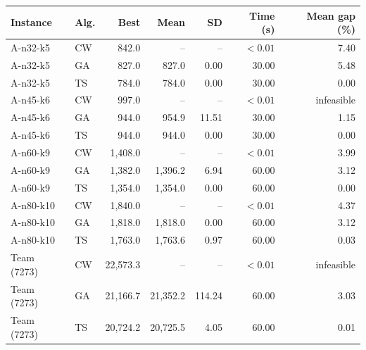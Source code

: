 \begin{tabular}{@{}llrrrrr@{}}
\toprule
Instance & Alg. & Best & Mean & SD & Time (s) & Mean gap (\%) \\
\midrule
A-n32-k5 & CW & 842.0 & -- & -- & $<0.01$ & 7.40 \\
A-n32-k5 & GA & 827.0 & 827.0 & 0.00 & 30.00 & 5.48 \\
A-n32-k5 & TS & 784.0 & 784.0 & 0.00 & 30.00 & 0.00 \\
A-n45-k6 & CW & 997.0 & -- & -- & $<0.01$ & infeasible \\
A-n45-k6 & GA & 944.0 & 954.9 & 11.51 & 30.00 & 1.15 \\
A-n45-k6 & TS & 944.0 & 944.0 & 0.00 & 30.00 & 0.00 \\
A-n60-k9 & CW & 1,408.0 & -- & -- & $<0.01$ & 3.99 \\
A-n60-k9 & GA & 1,382.0 & 1,396.2 & 6.94 & 60.00 & 3.12 \\
A-n60-k9 & TS & 1,354.0 & 1,354.0 & 0.00 & 60.00 & 0.00 \\
A-n80-k10 & CW & 1,840.0 & -- & -- & $<0.01$ & 4.37 \\
A-n80-k10 & GA & 1,818.0 & 1,818.0 & 0.00 & 60.00 & 3.12 \\
A-n80-k10 & TS & 1,763.0 & 1,763.6 & 0.97 & 60.00 & 0.03 \\
Team (7273) & CW & 22,573.3 & -- & -- & $<0.01$ & infeasible \\
Team (7273) & GA & 21,166.7 & 21,352.2 & 114.24 & 60.00 & 3.03 \\
Team (7273) & TS & 20,724.2 & 20,725.5 & 4.05 & 60.00 & 0.01 \\
\bottomrule
\end{tabular}
